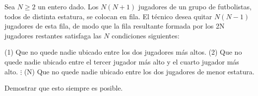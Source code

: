 Sea $N \ge 2$ un entero dado. Los $N(N + 1)$ jugadores de un grupo de futbolistas, todos de distinta estatura, se colocan en fila. El técnico desea quitar $N(N − 1)$ jugadores de esta fila, de modo que la fila resultante formada por los 2N jugadores restantes satisfaga las $N$ condiciones siguientes: \newline 

(1) Que no quede nadie ubicado entre los dos jugadores más altos. \newline 
(2) Que no quede nadie ubicado entre el tercer jugador más alto y el cuarto jugador más alto. \newline 
$\vdots$ \newline 
(N) Que no quede nadie ubicado entre los dos jugadores de menor estatura.  \newline 

Demostrar que esto siempre es posible.
